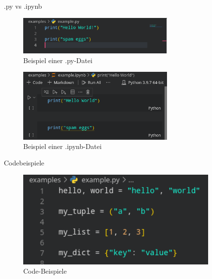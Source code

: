 \documentclass[10pt,ngerman]{beamer}
\begin{document}
\begin{frame}[fragile]{.py vs .ipynb}

  \begin{figure}
    \centering
    \includegraphics[width=0.7\textwidth]{pictures/py.png}
    \caption[Beispiel einer .py-Datei]{Beispiel einer .py-Datei}
  \end{figure}
  \begin{figure}
    \centering
    \includegraphics[width=0.7\textwidth]{pictures/ipynb.png}
    \caption[Beispiel einer .ipynb-Datei]{Beispiel einer .ipynb-Datei}
  \end{figure}
\end{frame}

\begin{frame}[fragile]{Codebeispiele}
  \begin{figure}
    \centering
    \includegraphics[width=0.9\textwidth]{pictures/examples.png}
    \caption[Code-Beispiele]{Code-Beispiele}
  \end{figure}
\end{frame}
\end{document}

